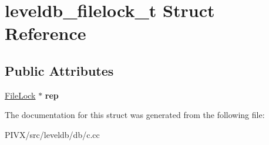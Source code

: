 \hypertarget{structleveldb__filelock__t}{}\section{leveldb\+\_\+filelock\+\_\+t Struct Reference}
\label{structleveldb__filelock__t}
\subsection*{Public Attributes}
\begin{DoxyCompactItemize}
\item 
\mbox{\label{structleveldb__filelock__t_a6c341dd7282427215e6b3ba47871a4f5}} 
\mbox{\hyperlink{classleveldb_1_1_file_lock}{File\+Lock}} $\ast$ {\bfseries rep}
\end{DoxyCompactItemize}


The documentation for this struct was generated from the following file\+:\begin{DoxyCompactItemize}
\item 
P\+I\+V\+X/src/leveldb/db/c.\+cc\end{DoxyCompactItemize}
